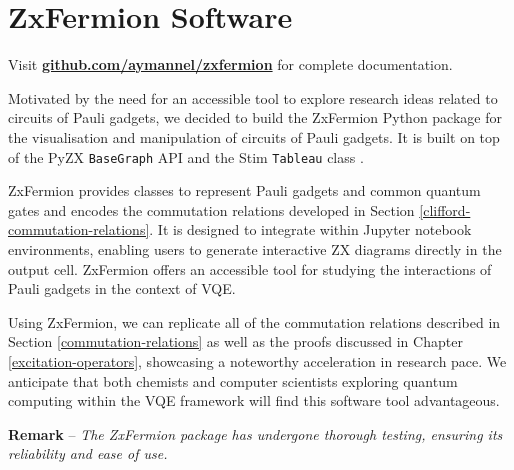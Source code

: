 \chapter{ZxFermion Software}%
\label{zxfermion}

Visit \textbf{\href{https://github.com/aymannel/zxfermion}{github.com/aymannel/zxfermion} }for complete documentation.

Motivated by the need for an accessible tool to explore research ideas related to circuits of Pauli gadgets, we decided to build the ZxFermion Python package for the visualisation and manipulation of circuits of Pauli gadgets. It is built on top of the PyZX \lstinline{BaseGraph} API \cite{Kissinger2020} and the Stim \lstinline{Tableau} class \cite{Gidney2021}.

ZxFermion provides classes to represent Pauli gadgets and common quantum gates and encodes the commutation relations developed in Section \ref{clifford-commutation-relations}. It is designed to integrate within Jupyter notebook environments, enabling users to generate interactive ZX diagrams directly in the output cell. ZxFermion offers an accessible tool for studying the interactions of Pauli gadgets in the context of VQE.

Using ZxFermion, we can replicate all of the commutation relations described in Section \ref{commutation-relations} as well as the proofs discussed in Chapter \ref{excitation-operators}, showcasing a noteworthy acceleration in research pace. We anticipate that both chemists and computer scientists exploring quantum computing within the VQE framework will find this software tool advantageous.

\hangindent=10pt 
\textbf{Remark} -- \textit{The ZxFermion package has undergone thorough testing, ensuring its reliability and ease of use.}

